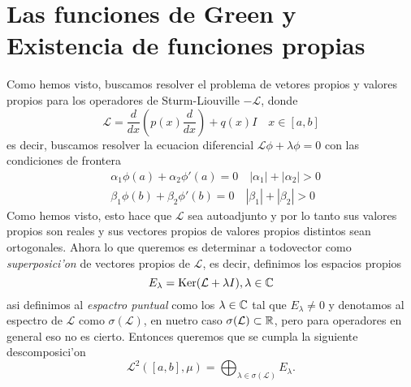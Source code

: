 \documentclass[main.tex]{subfiles}
\begin{document}
\section{Las funciones de Green y Existencia de funciones propias}
\noindent Como hemos visto, buscamos resolver el problema de vetores propios y valores propios para los operadores de Sturm-Liouville $-\mathcal{L}$, donde
\begin{equation}\label{SL-eq}
  \mathcal{L}=\dfrac{d}{dx}\left(p(x)\dfrac{d}{dx}\right)+q(x)I\quad x\in[a,b]
\end{equation}
es decir, buscamos resolver la ecuacion diferencial $\mathcal{L}\phi+\lambda\phi=0$ con las condiciones de frontera
\begin{align*}\label{SL-fron}
  &\alpha_{1}\phi(a)+\alpha_{2}\phi'(a)=0\quad|\alpha_{1}|+|\alpha_{2}|>0\\
  &\beta_{1}\phi(b)+\beta_{2}\phi'(b)=0\quad|\beta_{1}|+|\beta_{2}|>0
\end{align*}
Como hemos visto, esto hace que $\mathcal{L}$ sea autoadjunto y por lo tanto sus valores propios son reales y sus vectores propios de valores propios distintos sean ortogonales. Ahora lo que queremos es determinar a todovector como \emph{superposici'on} de vectores propios de $\mathcal{L}$, es decir, definimos los espacios propios
\[
  E_{\lambda}=\mathrm{Ker}(\mathcal{L}+\lambda I),\lambda\in\mathbb C 
\]
asi definimos al \emph{espactro puntual} como los $\lambda\in\mathbb C $ tal que $E_{\lambda}\neq 0$ y denotamos al espectro de $\mathcal{L}$ como $\sigma(\mathcal{L})$, en nuetro caso $\sigma(\mathcal{L})\subset\mathbb R $, pero para operadores en general eso no es cierto. Entonces queremos que se cumpla la siguiente descomposici'on
\[
  \mathcal{L}^{2}([a,b],\mu)=\bigoplus_{\lambda\in\sigma(\mathcal{L})}E_{\lambda}.
\]
\end{document}
